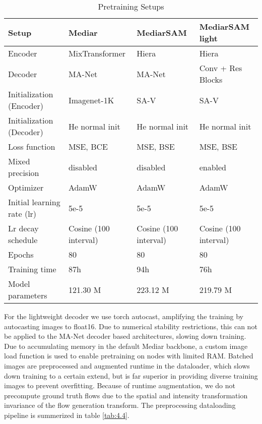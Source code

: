 \begin{table}[ht]
\centering
\footnotesize
\caption{Pretraining Setups}
\begin{tabular}{l l l l}
\hline\hline
\textbf{Setup} & \textbf{Mediar} & \textbf{MediarSAM} & \textbf{MediarSAM light} \\
\hline
Encoder                  &  MixTransformer \cite{} &  Hiera \cite{}      &        Hiera   \cite{}                \\
Decoder                  &  MA-Net\cite{}   &      MA-Net\cite{}                 &    Conv + Res Blocks              \\                    
Initialization (Encoder) &  Imagenet-1K \cite{}&    SA-V     &          SA-V              \\
Initialization (Decoder)&    He normal init       &         He normal init              &            He normal init        \\
Loss function            &   MSE, BCE               &      MSE, BSE                 &           MSE, BSE                \\
Mixed precision \cite{}  &          disabled                &       disabled        & enabled \\
Optimizer &     AdamW \cite{}             &       AdamW \cite{}                &       AdamW \cite{}                    \\
Initial learning rate (lr) &    5e-5              &           5e-5            &          5e-5                 \\
Lr decay schedule &    Cosine \cite{} (100 interval)        &     Cosine \cite{} (100 interval)     &  Cosine \cite{} (100 interval)                  \\
Epochs &  80                &         80              &            80               \\
\midrule
Training time &  87h                &         94h              &            76h               \\
Model parameters &  121.30 M                &         223.12 M              &            219.79 M                \\ 
\hline
\end{tabular}
\end{table}

For the lightweight decoder we use torch autocast, amplifying the training by autocasting images to float16. Due to numerical stability restrictions, this can not be applied to the MA-Net decoder based architectures, slowing down training. Due to accumulating memory in the default Mediar backbone, a custom image load function is used to enable pretraining on nodes with limited RAM. Batched images are preprocessed and augmented runtime in the dataloader, which slows down training to a certain extend, but is far superior in providing diverse training images to prevent overfitting. Because of runtime augmentation, we do not precompute ground truth flows due to the spatial and intensity transformation invariance of the flow generation transform. The preprocessing dataloading pipeline is summerized in table \ref{tab:4.4}.

